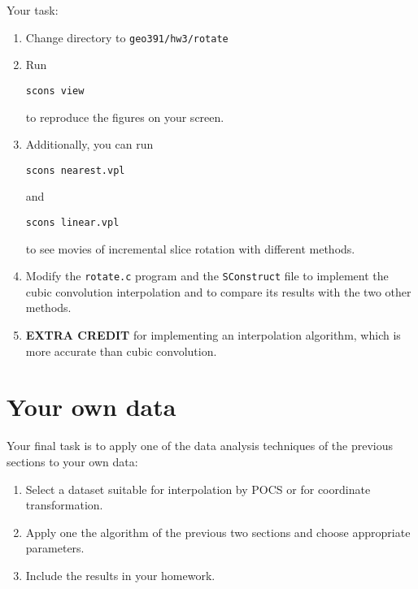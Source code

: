 \lstset{language=c,numbers=left,numberstyle=\tiny,showstringspaces=false}



\lstset{language=python,numbers=left,numberstyle=\tiny,showstringspaces=false}


Your task:
\begin{enumerate}
\item Change directory to \verb#geo391/hw3/rotate#
\item Run 
\begin{verbatim}
scons view
\end{verbatim}
to reproduce the figures on your screen.
\item Additionally, you can run
\begin{verbatim}
scons nearest.vpl
\end{verbatim}
and
\begin{verbatim}
scons linear.vpl
\end{verbatim}
to see movies of incremental slice rotation with different methods.
\item Modify the \texttt{rotate.c} program and the \texttt{SConstruct} file to implement the cubic convolution interpolation and to compare 
its results with the two other methods.
\item \textbf{EXTRA CREDIT} for implementing an interpolation algorithm, which is more accurate than cubic convolution.
\end{enumerate}

\section{Your own data}

Your final task is to apply one of the data analysis techniques of the
previous sections to your own data:
\begin{enumerate}
\item Select a dataset suitable for interpolation by POCS or for
  coordinate transformation.
\item Apply one the algorithm of the previous two sections and choose
  appropriate parameters.
\item Include the results in your homework.
\end{enumerate}

